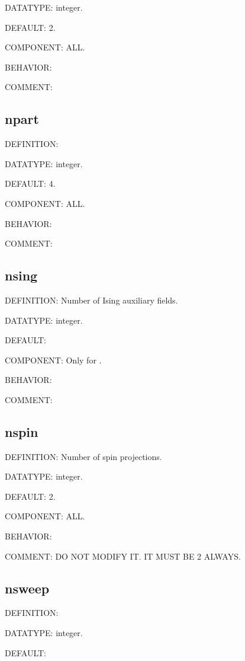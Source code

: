 {\color{green}DATATYPE:} integer.

{\color{blue}DEFAULT:} 2.

{\color{brown}COMPONENT:} ALL.

{\color{purple}BEHAVIOR:}

{\color{olive}COMMENT:}

\subsection{npart}
{\color{red}DEFINITION:}

{\color{green}DATATYPE:} integer.

{\color{blue}DEFAULT:} 4.

{\color{brown}COMPONENT:} ALL.

{\color{purple}BEHAVIOR:}

{\color{olive}COMMENT:}

\subsection{nsing}
{\color{red}DEFINITION:} Number of Ising auxiliary fields.

{\color{green}DATATYPE:} integer.

{\color{blue}DEFAULT:}

{\color{brown}COMPONENT:} Only for {\daisy}.

{\color{purple}BEHAVIOR:}

{\color{olive}COMMENT:}

\subsection{nspin}
{\color{red}DEFINITION:} Number of spin projections.

{\color{green}DATATYPE:} integer.

{\color{blue}DEFAULT:} 2.

{\color{brown}COMPONENT:} ALL.

{\color{purple}BEHAVIOR:}

{\color{olive}COMMENT:} DO NOT MODIFY IT. IT MUST BE 2 ALWAYS.

\subsection{nsweep}
{\color{red}DEFINITION:}

{\color{green}DATATYPE:} integer.

{\color{blue}DEFAULT:}


